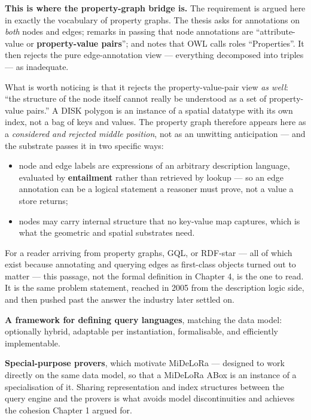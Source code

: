\documentclass[11pt,a4paper,DIV=12,parskip=half]{scrartcl}
\newenvironment{note}
  {\begin{list}{}{\setlength{\leftmargin}{1.5em}\setlength{\rightmargin}{1.5em}%
                  \setlength{\listparindent}{0pt}}\item[]\small}
  {\end{list}}
\begin{document}
\begin{note}
\textbf{This is where the property-graph bridge is.} The requirement is argued
here in exactly the vocabulary of property graphs. The thesis asks for
annotations on \emph{both} nodes and edges; remarks in passing that node
annotations are \enquote{attribute-value or \textbf{property-value pairs}}; and
notes that OWL calls roles \enquote{Properties}. It then rejects the pure
edge-annotation view --- everything decomposed into triples --- as inadequate.

What is worth noticing is that it rejects the property-value-pair view
\emph{as well}: \enquote{the structure of the node itself cannot really be
understood as a set of property-value pairs.} A DISK polygon is an instance of a
spatial datatype with its own index, not a bag of keys and values. The property
graph therefore appears here as a \emph{considered and rejected middle
position}, not as an unwitting anticipation --- and the substrate passes it in
two specific ways:

\begin{itemize}
\item node and edge labels are expressions of an arbitrary description language,
  evaluated by \textbf{entailment} rather than retrieved by lookup --- so an
  edge annotation can be a logical statement a reasoner must prove, not a value
  a store returns;
\item nodes may carry internal structure that no key-value map captures, which
  is what the geometric and spatial substrates need.
\end{itemize}

For a reader arriving from property graphs, GQL, or RDF-star --- all of which
exist because annotating and querying edges as first-class objects turned out to
matter --- this passage, not the formal definition in Chapter 4, is the one to
read. It is the same problem statement, reached in 2005 from the description
logic side, and then pushed past the answer the industry later settled on.
\end{note}

\textbf{A framework for defining query languages}, matching the data model:
optionally hybrid, adaptable per instantiation, formalisable, and efficiently
implementable.

\textbf{Special-purpose provers}, which motivate MiDeLoRa --- designed to work
directly on the same data model, so that a MiDeLoRa ABox is an instance of a
specialisation of it. Sharing representation and index structures between the
query engine and the provers is what avoids model discontinuities and achieves
the cohesion Chapter 1 argued for.
\end{document}
